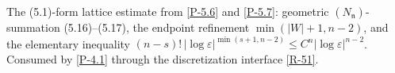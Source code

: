 \begin{proposition}\label{R-4.1pf}
  \leanok
  The (5.1)-form lattice estimate from \ref{P-5.6} and \ref{P-5.7}:
  geometric \((N_{\mathfrak n})\)-summation (5.16)--(5.17), the endpoint
  refinement \(\min(\lvert W\rvert + 1, n-2)\), and the elementary
  inequality \((n-s)!\,\lvert\log\varepsilon\rvert^{\min(s+1,n-2)}
  \le C^n\lvert\log\varepsilon\rvert^{n-2}\). Consumed by \ref{P-4.1}
  through the discretization interface \ref{R-51}.
\end{proposition}
